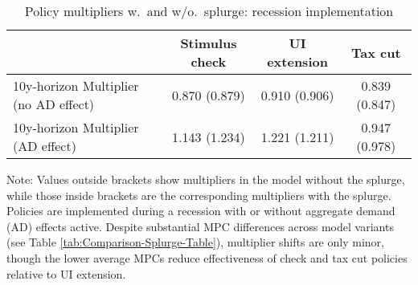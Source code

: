 \documentclass{econsocart}
\begin{document}
\begin{table}[tb] 
  \caption{Policy multipliers w.\ and w/o.\ splurge: recession implementation}
  \label{tab:Multiplier-SplurgeComp} 
  \centering

  \begin{tabular*}
    {\textwidth}{@{\extracolsep{\fill}}lccc@{}}
    \hline
    & Stimulus check & UI extension & Tax cut \\ \hline
    10y-horizon Multiplier (no AD effect) & 0.870 (0.879) & 0.910 (0.906) & 0.839 (0.847) \\
    10y-horizon Multiplier (AD effect)    & 1.143 (1.234) & 1.221 (1.211) & 0.947 (0.978) \\
    \hline
  \end{tabular*}

  \noindent\parbox{\textwidth}{
    \medskip
    \footnotesize Note: Values outside brackets show multipliers in the model without the splurge, while those inside brackets are the corresponding multipliers with the splurge. Policies are implemented during a recession with or without aggregate demand (AD) effects active. Despite substantial MPC differences across model variants (see Table \ref{tab:Comparison-Splurge-Table}), multiplier shifts are only minor, though the lower average MPCs reduce effectiveness of check and tax cut policies relative to UI extension.
  }
\end{table}

\vspace{0.5em}
\end{document}
